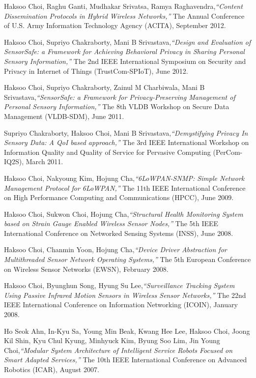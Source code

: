 \documentclass[12pt,letterpaper]{article}
\begin{document}
\bigskip
Haksoo Choi, Raghu Ganti, Mudhakar Srivatsa, Ramya Raghavendra,\emph{``Content Dissemination Protocols in Hybrid Wireless Networks,''} The Annual Conference of U.S. Army Information Technology Agency (ACITA), September 2012.

\bigskip
Haksoo Choi, Supriyo Chakraborty, Mani B Srivastava,\emph{``Design and Evaluation of SensorSafe: a Framework for Achieving Behavioral Privacy in Sharing Personal Sensory Information,''} The 2nd IEEE International Symposium on Security and Privacy in Internet of Things (TrustCom-SPIoT), June 2012.

\bigskip
Haksoo Choi, Supriyo Chakraborty, Zainul M Charbiwala, Mani B Srivastava,\emph{``SensorSafe: a Framework for Privacy-Preserving Management of Personal Sensory Information,''} The 8th VLDB Workshop on Secure Data Management (VLDB-SDM), June 2011.

\bigskip
Supriyo Chakraborty, Haksoo Choi, Mani B Srivastava,\emph{``Demystifying Privacy In Sensory Data: A QoI based approach,''} The 3rd IEEE International Workshop on Information Quality and Quality of Service for Pervasive Computing (PerCom-IQ2S), March 2011.

\bigskip
Haksoo Choi, Nakyoung Kim, Hojung Cha,\emph{``6LoWPAN-SNMP: Simple Network Management Protocol for 6LoWPAN,''} The 11th IEEE International Conference on High Performance Computing and Communications (HPCC), June 2009.

\bigskip
Haksoo Choi, Sukwon Choi, Hojung Cha,\emph{``Structural Health Monitoring System based on Strain Gauge Enabled Wireless Sensor Nodes,''} The 5th IEEE International Conference on Networked Sensing Systems (INSS), June 2008.

\bigskip
Haksoo Choi, Chanmin Yoon, Hojung Cha,\emph{``Device Driver Abstraction for Multithreaded Sensor Network Operating Systems,''} The 5th European Conference on Wireless Sensor Networks (EWSN), February 2008.

\bigskip
Haksoo Choi, Byunghun Song, Hyung Su Lee,\emph{``Surveillance Tracking System Using Passive Infrared Motion Sensors in Wireless Sensor Networks,''} The 22nd IEEE International Conference on Information Networking (ICOIN), January 2008.

\bigskip
Ho Seok Ahn, In-Kyu Sa, Young Min Beak, Kwang Hee Lee, Haksoo Choi, Joong Kil Shin, Kyu Chul Kyung, Minhyuck Kim, Byung Soo Lim, Jin Young Choi,\emph{``Modular System Architecture of Intelligent Service Robots Focused on Smart Adapted Services,''} The 10th IEEE International Conference on Advanced Robotics (ICAR), August 2007.
\end{document}
